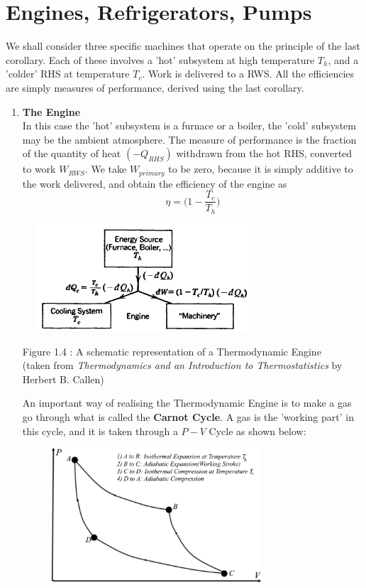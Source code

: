 \documentclass[oneside]{book}
\begin{document}
\section{Engines, Refrigerators, Pumps}
We shall consider three specific machines that operate on the principle of the last corollary. Each of these involves a 'hot' subsystem at high temperature $T_h$, and a 'colder' RHS at temperature $T_c$. Work is delivered to a RWS. All the efficiencies are simply measures of performance, derived using the last corollary. 
\begin{enumerate}
    	\setcounter{enumi}{0}
	\item \textbf{The Engine}\\
	In this case the 'hot' subsystem is a furnace or a boiler, the 'cold' subsystem may be the ambient atmosphere. The measure of performance is the fraction of the quantity of heat $(-Q_{RHS})$ withdrawn from the hot RHS, converted to work $W_{RWS}$. We take $W_{primary}$ to be zero, because it is simply additive to the work delivered, and obtain the efficiency of the engine as
	\[\eta = \Bigg(1 - \frac {T_{c}} {T_{h}}\Bigg) \]
	\begin{center}
\includegraphics[width = 9cm, height = 4cm]{Engine}
\end{center}
\begin{center}
Figure 1.4 : A schematic representation of a Thermodynamic Engine\\
(taken from \emph{Thermodynamics and an Introduction to Thermostatistics} by Herbert B. Callen)
\end{center}
	An important way of realising the Thermodynamic Engine is to make a gas go through what is called the \textbf{Carnot Cycle}. A gas is the 'working part' in this cycle, and it is taken through a $P-V$ Cycle as shown below:\\
	\begin{center}
\includegraphics[width = 10cm, height = 5cm]{PV}

\end{center}
\end{enumerate}
\end{document}
